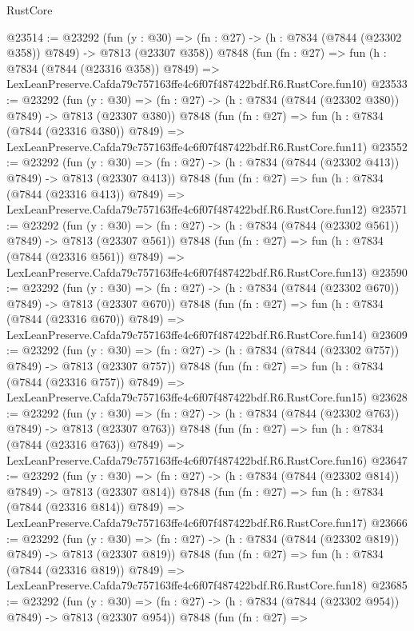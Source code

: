 \begin{lexlean}{RustCore}
\begin{coremodule}
@23514 := @23292
    (fun (y : @30) => (fn : @27) -> (h : @7834 (@7844 (@23302 @358)) @7849) -> @7813 (@23307 @358))
    @7848
    (fun (fn : @27) =>
    fun (h : @7834 (@7844 (@23316 @358)) @7849) =>
    LexLeanPreserve.Cafda79c757163ffe4c6f07f487422bdf.R6.RustCore.fun10)
@23533 := @23292
    (fun (y : @30) => (fn : @27) -> (h : @7834 (@7844 (@23302 @380)) @7849) -> @7813 (@23307 @380))
    @7848
    (fun (fn : @27) =>
    fun (h : @7834 (@7844 (@23316 @380)) @7849) =>
    LexLeanPreserve.Cafda79c757163ffe4c6f07f487422bdf.R6.RustCore.fun11)
@23552 := @23292
    (fun (y : @30) => (fn : @27) -> (h : @7834 (@7844 (@23302 @413)) @7849) -> @7813 (@23307 @413))
    @7848
    (fun (fn : @27) =>
    fun (h : @7834 (@7844 (@23316 @413)) @7849) =>
    LexLeanPreserve.Cafda79c757163ffe4c6f07f487422bdf.R6.RustCore.fun12)
@23571 := @23292
    (fun (y : @30) => (fn : @27) -> (h : @7834 (@7844 (@23302 @561)) @7849) -> @7813 (@23307 @561))
    @7848
    (fun (fn : @27) =>
    fun (h : @7834 (@7844 (@23316 @561)) @7849) =>
    LexLeanPreserve.Cafda79c757163ffe4c6f07f487422bdf.R6.RustCore.fun13)
@23590 := @23292
    (fun (y : @30) => (fn : @27) -> (h : @7834 (@7844 (@23302 @670)) @7849) -> @7813 (@23307 @670))
    @7848
    (fun (fn : @27) =>
    fun (h : @7834 (@7844 (@23316 @670)) @7849) =>
    LexLeanPreserve.Cafda79c757163ffe4c6f07f487422bdf.R6.RustCore.fun14)
@23609 := @23292
    (fun (y : @30) => (fn : @27) -> (h : @7834 (@7844 (@23302 @757)) @7849) -> @7813 (@23307 @757))
    @7848
    (fun (fn : @27) =>
    fun (h : @7834 (@7844 (@23316 @757)) @7849) =>
    LexLeanPreserve.Cafda79c757163ffe4c6f07f487422bdf.R6.RustCore.fun15)
@23628 := @23292
    (fun (y : @30) => (fn : @27) -> (h : @7834 (@7844 (@23302 @763)) @7849) -> @7813 (@23307 @763))
    @7848
    (fun (fn : @27) =>
    fun (h : @7834 (@7844 (@23316 @763)) @7849) =>
    LexLeanPreserve.Cafda79c757163ffe4c6f07f487422bdf.R6.RustCore.fun16)
@23647 := @23292
    (fun (y : @30) => (fn : @27) -> (h : @7834 (@7844 (@23302 @814)) @7849) -> @7813 (@23307 @814))
    @7848
    (fun (fn : @27) =>
    fun (h : @7834 (@7844 (@23316 @814)) @7849) =>
    LexLeanPreserve.Cafda79c757163ffe4c6f07f487422bdf.R6.RustCore.fun17)
@23666 := @23292
    (fun (y : @30) => (fn : @27) -> (h : @7834 (@7844 (@23302 @819)) @7849) -> @7813 (@23307 @819))
    @7848
    (fun (fn : @27) =>
    fun (h : @7834 (@7844 (@23316 @819)) @7849) =>
    LexLeanPreserve.Cafda79c757163ffe4c6f07f487422bdf.R6.RustCore.fun18)
@23685 := @23292
    (fun (y : @30) => (fn : @27) -> (h : @7834 (@7844 (@23302 @954)) @7849) -> @7813 (@23307 @954))
    @7848
    (fun (fn : @27) =>

\end{coremodule}
\end{lexlean}

